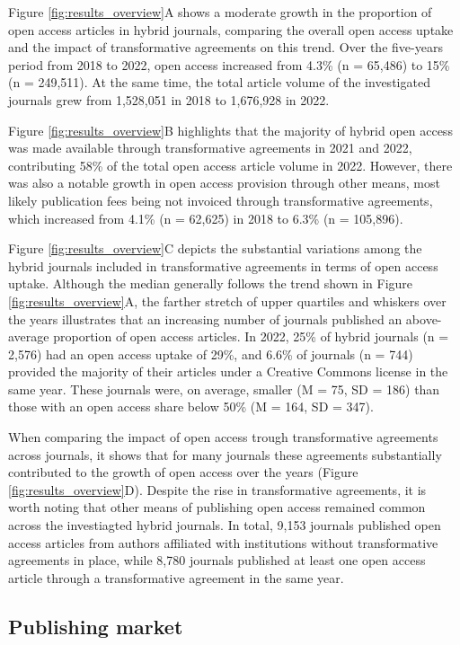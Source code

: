 \documentclass[a4paper,man,floatsintext,longtable,noextraspace,12pt]{apa6}
\begin{document}
Figure \ref{fig:results_overview}A shows a moderate growth in the
proportion of open access articles in hybrid journals, comparing the
overall open access uptake and the impact of transformative agreements
on this trend. Over the five-years period from 2018 to 2022, open access
increased from 4.3\% (n = 65,486) to 15\% (n = 249,511). At the same
time, the total article volume of the investigated journals grew from
1,528,051 in 2018 to 1,676,928 in 2022.

Figure \ref{fig:results_overview}B highlights that the majority of
hybrid open access was made available through transformative agreements
in 2021 and 2022, contributing 58\% of the total open access article
volume in 2022. However, there was also a notable growth in open access
provision through other means, most likely publication fees being not
invoiced through transformative agreements, which increased from 4.1\%
(n = 62,625) in 2018 to 6.3\% (n = 105,896).

Figure \ref{fig:results_overview}C depicts the substantial variations
among the hybrid journals included in transformative agreements in terms
of open access uptake. Although the median generally follows the trend
shown in Figure \ref{fig:results_overview}A, the farther stretch of
upper quartiles and whiskers over the years illustrates that an
increasing number of journals published an above-average proportion of
open access articles. In 2022, 25\% of hybrid journals (n = 2,576) had
an open access uptake of 29\%, and 6.6\% of journals (n = 744) provided
the majority of their articles under a Creative Commons license in the
same year. These journals were, on average, smaller (M = 75, SD = 186)
than those with an open access share below 50\% (M = 164, SD = 347).

When comparing the impact of open access trough transformative
agreements across journals, it shows that for many journals these
agreements substantially contributed to the growth of open access over
the years (Figure \ref{fig:results_overview}D). Despite the rise in
transformative agreements, it is worth noting that other means of
publishing open access remained common across the investiagted hybrid
journals. In total, 9,153 journals published open access articles from
authors affiliated with institutions without transformative agreements
in place, while 8,780 journals published at least one open access
article through a transformative agreement in the same year.

\hypertarget{publishing-market}{%
\subsection{Publishing market}\label{publishing-market}}
\end{document}
